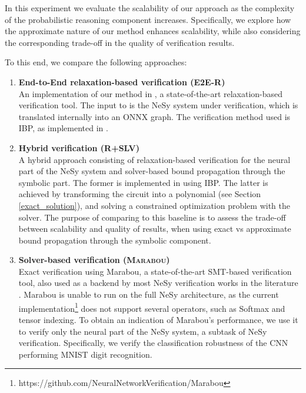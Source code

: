 In this experiment we evaluate the scalability of our approach as the complexity of the probabilistic reasoning component increases. Specifically, we explore how the approximate nature of our method enhances scalability, while also considering the corresponding trade-off in the quality of verification results. 

\noindent To this end, we compare the following approaches:

\begin{enumerate}
    \item \textbf{End-to-End relaxation-based verification \big(\textsc{E2E-R}\big)} \\
    An implementation of our method in \lirpa, a state-of-the-art relaxation-based verification tool. The input to \lirpa is the NeSy system under verification, which is translated internally into an ONNX graph. The verification method used is IBP, as implemented in \lirpa.
    \item \textbf{Hybrid verification \big(\textsc{R+SLV}\big)} \\
    A hybrid approach consisting of relaxation-based verification for the neural part of the NeSy system and solver-based bound propagation through the symbolic part. The former is implemented in \lirpa using IBP. The latter is achieved by transforming the circuit into a polynomial (see Section \ref{exact_solution}), and solving a constrained optimization problem with the \gurobi solver. The purpose of comparing to this baseline is to assess the trade-off between scalability and quality of results, when using exact vs approximate bound propagation through the symbolic component. 
    \item \textbf{Solver-based verification \big(\textsc{Marabou}\big)} \\
    Exact verification using Marabou, a state-of-the-art SMT-based verification tool, also used as a backend by most NeSy verification works in the literature \cite{xie2022neuro,daggitt2024vehiclebridgingembeddinggap}. Marabou is unable to run on the full NeSy architecture, as the current implementation\footnote{https://github.com/NeuralNetworkVerification/Marabou} does not support several operators, such as Softmax and tensor indexing. To obtain an indication of Marabou's performance, we use it to verify only the neural part of the NeSy system, a subtask of NeSy verification. Specifically, we verify the classification robustness of the CNN performing MNIST digit recognition. 
\end{enumerate}

